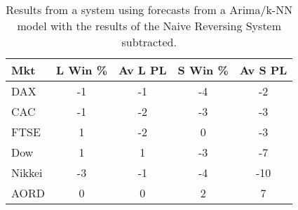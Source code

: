 \begin{table}[ht]
\centering
\caption[Mean PL from hybrid ARIMA/k-NN models minus mean PL from Naive Reverse system]{Results from a system using forecasts from a Arima/k-NN model with the results of the Naive Reversing System subtracted.} 
\label{tab:chp_ts:pred_close_arima_knn_sys1_diff}
\begin{tabular}{lcccc}
  \toprule Mkt & L Win \% & Av L PL & S Win \% & Av S PL \\ 
  \midrule DAX & -1 & -1 & -4 & -2 \\ 
  CAC & -1 & -2 & -3 & -3 \\ 
  FTSE & 1 & -2 & 0 & -3 \\ 
  Dow & 1 & 1 & -3 & -7 \\ 
  Nikkei & -3 & -1 & -4 & -10 \\ 
  AORD & 0 & 0 & 2 & 7 \\ 
   \bottomrule \end{tabular}
\end{table}
